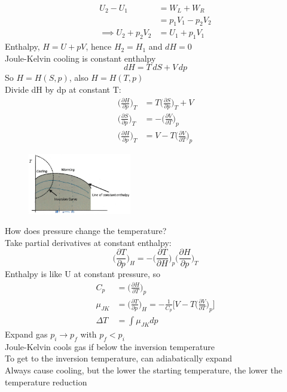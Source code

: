 \documentclass[a4paper, 11pt, normalem]{report}
\newcommand\p{\partial}
\begin{document}
\begin{align*}
    U_2 - U_1 &= W_L + W_R \\
    &= p_1 V_1 - p_2 V_2 \\
    \implies U_2 + p_2 V_2 &= U_1 + p_1 V_1
\end{align*}
Enthalpy, $H = U + pV$, hence $H_2 = H_1$ and $dH = 0$ \\
Joule-Kelvin cooling is constant enthalpy
\begin{equation*}
    dH = T\,dS + V\,dp
\end{equation*}
So $H = H(S,p)$, also $H = H(T,p)$ \\
Divide dH by dp at constant T:
\begin{align*}
    \Big(\frac{\p H}{\p p}\Big)_T &= T\Big(\frac{\p S}{\p p}\Big)_T + V \\
    \Big(\frac{\p S}{\p p}\Big)_T &= -\Big(\frac{\p V}{\p T}\Big)_p \\
    \Big(\frac{\p H}{\p p}\Big)_T &= V - T\Big(\frac{\p V}{\p T}\Big)_p
\end{align*}

\begin{figure}
    \begin{center}
        \includegraphics[width=0.4\textwidth]{JouleKelvin2.png}
        \vspace{-50pt}
    \end{center}
\end{figure}

How does pressure change the temperature? \\
Take partial derivatives at constant enthalpy:
\begin{equation*}
    \Big(\frac{\p T}{\p p}\Big)_H = -\Big(\frac{\p T}{\p H}\Big)_p \Big(\frac{\p H}{\p p}\Big)_T
\end{equation*}
Enthalpy is like U at constant pressure, so
\begin{align*}
    C_p &= \Big(\frac{\p H}{\p T}\Big)_p \\
    \mu_{JK} &= \Big(\frac{\p T}{\p p}\Big)_H = -\frac{1}{C_p} \bigg[V - T\Big(\frac{\p V}{\p T}\Big)_p\bigg] \\
    \Delta T &= \int \mu_{JK} dp
\end{align*}
Expand gas $p_i \to p_f$ with $p_f < p_i$ \\
Joule-Kelvin cools gas if below the inversion temperature \\
To get to the inversion temperature, can adiabatically expand \\
Always cause cooling, but the lower the starting temperature, the lower the temperature reduction
\end{document}
